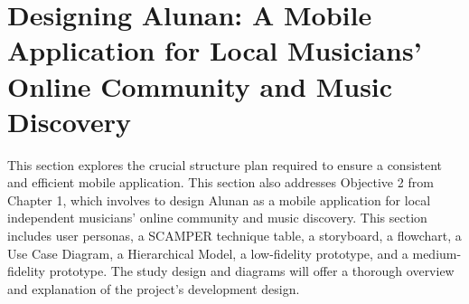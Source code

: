 
\section{Designing Alunan: A Mobile Application for Local Musicians’ Online Community and Music Discovery}
This section explores the crucial structure plan required to ensure a consistent and efficient mobile application. This section also addresses Objective 2 from Chapter 1, which involves to design Alunan as a mobile application for local independent musicians’ online community and music discovery. This section includes user personas, a SCAMPER technique table, a storyboard, a flowchart, a Use Case Diagram, a Hierarchical Model, a low-fidelity prototype, and a medium-fidelity prototype. The study design and diagrams will offer a thorough overview and explanation of the project's development design.

